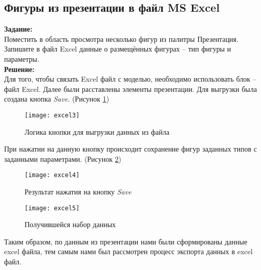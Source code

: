 \subsection*{Фигуры из презентации в файл MS Excel}

\textbf{Задание:}\\
Поместить в область просмотра несколько фигур из палитры Презентация. Запишите в файл Excel данные о размещённых фигурах -- тип фигуры и параметры.\\

\textbf{Решение:}\\
Для того, чтобы связать Excel файл с моделью, необходимо использовать блок -- файл Excel. Далее были расставлены элементы презентации. Для выгрузки была создана кнопка \textit{Save}. (Рисунок \ref{fig:excel3})
\begin{figure}[h]
	\centering \texttt{[image: excel3]}
	\caption{Логика кнопки для выгрузки данных из файла}
	\label{fig:excel3}
\end{figure}

\newpage

При нажатии на данную кнопку происходит сохранение фигур заданных типов с заданными параметрами. (Рисунок \ref{fig:excel4})
\begin{figure}[h]
	\centering \texttt{[image: excel4]}
	\caption{Результат нажатия на кнопку \textit{Save}}
	\label{fig:excel4}
\end{figure}

\begin{figure}[h]
	\centering \texttt{[image: excel5]}
	\caption{Получившейся набор данных}
	\label{fig:excel5}
\end{figure}

Таким образом, по данным из презентации нами были сформированы данные excel файла, тем самым нами был рассмотрен процесс экспорта данных в excel файл.